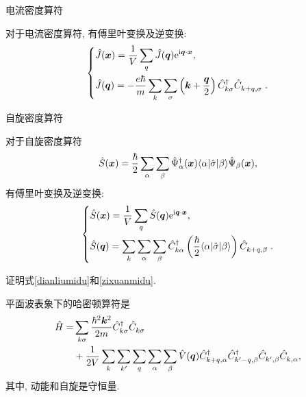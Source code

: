 \begin{example}电流密度算符

对于电流密度算符, 有傅里叶变换及逆变换: 
\begin{equation}\label{dianliumidu}
   \left\{
\begin{aligned}
&\hat J(\boldsymbol{x})=\frac{1}{V}\sum_{ q}\hat J(\boldsymbol{q})\mathrm e^{\mathrm i\boldsymbol{q}\cdot \boldsymbol{x}}, \\
&\hat J(\boldsymbol{q})=-\frac{e\hbar}{m}\sum_{ k}\sum_{\sigma}\left( \boldsymbol{k}+\frac{\boldsymbol{q}}{2} \right)\hat C_{ k{\sigma}}^\dagger \hat{C}_{{k+q}, {\sigma}}^{}\;. 
\end{aligned}
\right. 
\end{equation}
\end{example}

\begin{example}自旋密度算符

对于自旋密度算符 
\begin{equation}
   \hat S(\boldsymbol{x})=\frac{\hbar}{2}\sum_\alpha\sum_\beta\hat\Psi_\alpha^\dagger(\boldsymbol{x})\langle \alpha|\hat{\sigma}|\beta \rangle \hat\Psi_\beta(\boldsymbol{x}), 
\end{equation}
有傅里叶变换及逆变换: 
\begin{equation}\label{zixuanmidu}
   \left\{
\begin{aligned}
&\hat S(\boldsymbol{x})=\frac{1}{V}\sum_{{q}} \hat S(\boldsymbol{q})\mathrm e^{\mathrm i\boldsymbol{q}\cdot\boldsymbol{x}}, \\
&\hat S(\boldsymbol{q})=\sum_{{k}}\sum_\alpha\sum_\beta\hat C_{ k\alpha}^\dagger\left( \frac{\hbar}{2}\langle \alpha|\hat {\sigma}|\beta \rangle \right)\hat C_{{k+q}, \beta}^{}\;. 
\end{aligned}
\right. 
\end{equation}
\end{example}

\begin{question}{}{}
证明式\eqref{dianliumidu}和\eqref{zixuanmidu}.
\end{question}

平面波表象下的哈密顿算符是
\begin{align}
      \hat H=&\sum_{ k\sigma}\frac{\hbar^2\boldsymbol{k}^2}{2m}\hat C_{ k\sigma}^\dagger \hat C_{ k\sigma}^{}\nonumber\\
      &+\frac{1}{2V}\sum_{k}\sum_{k'}\sum_{q}\sum_\alpha\sum_\beta \hat{V}({\boldsymbol q})\hat{C}_{{k+q}, \alpha}^\dagger\hat{C}_{{k'-q}, \beta}^\dagger \hat{C}^{}_{k', \beta}\hat C^{}_{k, \alpha}, 
   \end{align}
其中, 动能和自旋是守恒量. 

